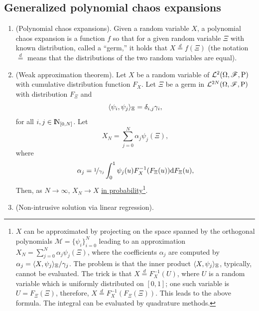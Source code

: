 \documentclass[a4paper,10pt]{scrbook}
\begin{document}
\subsection{Generalized polynomial chaos expansions}
\begin{enumerate}
 \item (Polynomial chaos expansions). Given a random variable \(X\), a polynomial chaos expansion 
       is a function \(f\) so that for a given random variable \(\Xi\) with known distribution, 
       called a ``germ,'' it holds that \(X \overset{d}{=} f(\Xi)\) (the notation \(\overset{d}{=}\)
       means that the distributions of the two random variables are equal).
 \item (Weak approximation theorem). Let \(X\) be a random variable of \(\mathcal{L}^2(\Omega,\mathscr{F},\mathrm{P})\) with 
       cumulative distribution function \(F_X\). Let \(\Xi\) be a germ in \(\mathcal{L}^{2N}(\Omega,\mathscr{F},\mathrm{P})\)
       with distribution \(F_\Xi\) and 
       \[
        \langle\psi_i, \psi_j\rangle_\Xi = \delta_{i,j}\gamma_i,
       \]
       for all \(i,j\in\N_{[0,N]}\). Let
       \[
        X_N = \sum_{j=0}^{N}\alpha_j \psi_j(\Xi),
       \]
       where 
       \[
        \alpha_j = \nicefrac{1}{\gamma_j} \int_0^1 \psi_j(u) F_{X}^{-1}(F_{\Xi}(u)) \mathrm{d} F_{\Xi}(u),
       \]
       Then, as \(N\to\infty\), \(X_N\to X\) 
       \hyperlink{link:convergence_in_probability}{in probability}\footnote{%
	      \(X\) can be approximated by projecting on the space spanned by the 
	      orthogonal polynomials \(\mathcal{M} = \{\psi_i\}_{i=0}^{N}\) leading
	      to an approximation \(X_N = \sum_{j=0}^{N} \alpha_j \psi_j(\Xi)\), where
	      the coefficients \(\alpha_j\) are computed by \(\alpha_j {}={} \langle X, \psi_j\rangle_\Xi/\gamma_j\).
	      The problem is that the inner product \(\langle X, \psi_j\rangle_\Xi\), typically, cannot be 
	      evaluated.
	      The trick is that \(X \overset{d}{=} F_X^{-1}(U)\), where \(U\) is a random variable
	      which is uniformly distributed on \([0,1]\); one such variable is \(U=F_{\Xi}(\Xi)\), 
	      therefore, \(X \overset{d}{=} F_{X}^{-1}(F_{\Xi}(\Xi))\). This leads to the above formula.
	      The integral can be evaluated by quadrature methods.
       }.

 \item (Non-intrusive solution via linear regression).
 

\end{enumerate}
\end{document}

